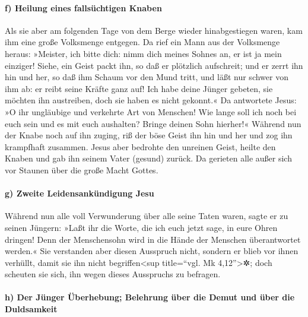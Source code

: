 \hypertarget{f-heilung-eines-fallsuxfcchtigen-knaben}{%
\paragraph{f) Heilung eines fallsüchtigen
Knaben}\label{f-heilung-eines-fallsuxfcchtigen-knaben}}

 Als sie aber am folgenden Tage von dem Berge wieder
hinabgestiegen waren, kam ihm eine große Volksmenge entgegen.
 Da rief ein Mann aus der Volksmenge heraus: »Meister,
ich bitte dich: nimm dich meines Sohnes an, er ist ja mein einziger!
 Siehe, ein Geist packt ihn, so daß er plötzlich
aufschreit; und er zerrt ihn hin und her, so daß ihm Schaum vor den Mund
tritt, und läßt nur schwer von ihm ab: er reibt seine Kräfte ganz auf!
 Ich habe deine Jünger gebeten, sie möchten ihn
austreiben, doch sie haben es nicht gekonnt.«  Da
antwortete Jesus: »O ihr ungläubige und verkehrte Art von Menschen! Wie
lange soll ich noch bei euch sein und es mit euch aushalten? Bringe
deinen Sohn hierher!«  Während nun der Knabe noch auf ihn
zuging, riß der böse Geist ihn hin und her und zog ihn krampfhaft
zusammen. Jesus aber bedrohte den unreinen Geist, heilte den Knaben und
gab ihn seinem Vater (gesund) zurück.  Da gerieten alle
außer sich vor Staunen über die große Macht Gottes.

\hypertarget{g-zweite-leidensankuxfcndigung-jesu}{%
\paragraph{g) Zweite Leidensankündigung
Jesu}\label{g-zweite-leidensankuxfcndigung-jesu}}

Während nun alle voll Verwunderung über alle seine Taten waren, sagte er
zu seinen Jüngern:  »Laßt ihr die Worte, die ich euch
jetzt sage, in eure Ohren dringen! Denn der Menschensohn wird in die
Hände der Menschen überantwortet werden.«  Sie verstanden
aber diesen Ausspruch nicht, sondern er blieb vor ihnen verhüllt, damit
sie ihn nicht begriffen\textless sup title=``vgl. Mk
4,12''\textgreater✲; doch scheuten sie sich, ihn wegen dieses Ausspruchs
zu befragen.

\hypertarget{h-der-juxfcnger-uxfcberhebung-belehrung-uxfcber-die-demut-und-uxfcber-die-duldsamkeit}{%
\paragraph{h) Der Jünger Überhebung; Belehrung über die Demut und über
die
Duldsamkeit}\label{h-der-juxfcnger-uxfcberhebung-belehrung-uxfcber-die-demut-und-uxfcber-die-duldsamkeit}}

